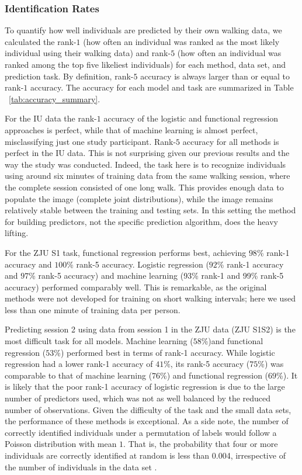 \subsubsection{Identification Rates}
To quantify how well individuals are predicted by their own walking data, we calculated the rank-$1$ (how often an individual was ranked as the most likely individual using their walking data) and rank-$5$ (how often an individual was ranked among the top five likeliest individuals) for each method, data set, and prediction task. By definition, rank-$5$ accuracy is always larger than or equal to rank-$1$ accuracy. The accuracy for each model and task are summarized in Table ~\ref{tab:accuracy_summary}.

For the IU data the rank-$1$ accuracy of the logistic and functional regression approaches is perfect, while that of machine learning is almost perfect, misclassifying just one study participant. Rank-$5$ accuracy for all methods is perfect in the IU data. This is not surprising given our previous results and the way the study was conducted. Indeed, the task here is to recognize individuals using around six minutes of training data from the same walking session, where the complete session consisted of one long walk. This provides enough data to populate the image (complete joint distributions), while the image remains relatively stable between the training and testing sets. In this setting the method for building predictors, not the specific prediction algorithm, does the heavy lifting.

For the ZJU S1 task, functional regression performs best, achieving $98$\% rank-1 accuracy and $100$\% rank-5 accuracy.  Logistic regression ($92$\% rank-1 accuracy and $97$\% rank-5 accuracy) and machine learning (93\% rank-1 and 99\% rank-5 accuracy) performed comparably well. This is remarkable, as the original methods were not developed for training on short walking intervals; here we used less than one minute of training data per person. 

Predicting session 2 using data from session 1 in the ZJU data (ZJU S1S2) is the most difficult task for all models. Machine learning ($58$\%)and functional regression ($53$\%) performed best in terms of rank-1 accuracy. While logistic regression had a lower rank-1 accuracy of $41$\%, its rank-5 accuracy ($75$\%) was comparable to that of machine learning ($76$\%) and functional regression ($69$\%). It is likely that the poor rank-1 accuracy of logistic regression is due to the large number of predictors used, which was not as well balanced by the reduced number of observations. Given the difficulty of the task and the small data sets, the performance of these methods is exceptional. As a side note, the number of correctly identified individuals under a permutation of labels would follow a Poisson distribution with mean $1$. That is, the probability that four or more individuals are correctly identified at random is less than 0.004, irrespective of the number of individuals in the data set \cite{fingerprintingCaffo}.


